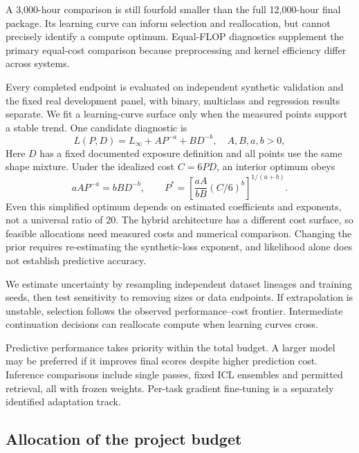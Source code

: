 \documentclass[11pt]{article}
\begin{document}
A 3,000-hour comparison is still fourfold smaller than the full 12,000-hour final package. Its learning curve can inform selection and reallocation, but cannot precisely identify a compute optimum. Equal-FLOP diagnostics supplement the primary equal-cost comparison because preprocessing and kernel efficiency differ across systems.

Every completed endpoint is evaluated on independent synthetic validation and the fixed real development panel, with binary, multiclass and regression results separate. We fit a learning-curve surface only when the measured points support a stable trend. One candidate diagnostic is
\begin{equation}
L(P,D)=L_\infty+A P^{-a}+B D^{-b},\quad A,B,a,b>0,
\end{equation}
Here $D$ has a fixed documented exposure definition and all points use the same shape mixture. Under the idealized cost $C=6PD$, an interior optimum obeys
\begin{equation}
aA P^{-a}=bB D^{-b},\qquad
P^*=\left[\frac{aA}{bB}(C/6)^b\right]^{1/(a+b)}.
\end{equation}
Even this simplified optimum depends on estimated coefficients and exponents, not a universal ratio of 20. The hybrid architecture has a different cost surface, so feasible allocations need measured costs and numerical comparison. Changing the prior requires re-estimating the synthetic-loss exponent, and likelihood alone does not establish predictive accuracy.

We estimate uncertainty by resampling independent dataset lineages and training seeds, then test sensitivity to removing sizes or data endpoints. If extrapolation is unstable, selection follows the observed performance--cost frontier. Intermediate continuation decisions can reallocate compute when learning curves cross.

Predictive performance takes priority within the total budget. A larger model may be preferred if it improves final scores despite higher prediction cost. Inference comparisons include single passes, fixed ICL ensembles and permitted retrieval, all with frozen weights. Per-task gradient fine-tuning is a separately identified adaptation track.

\subsection{Allocation of the project budget}
\label{sec:revised-budget}
\end{document}
